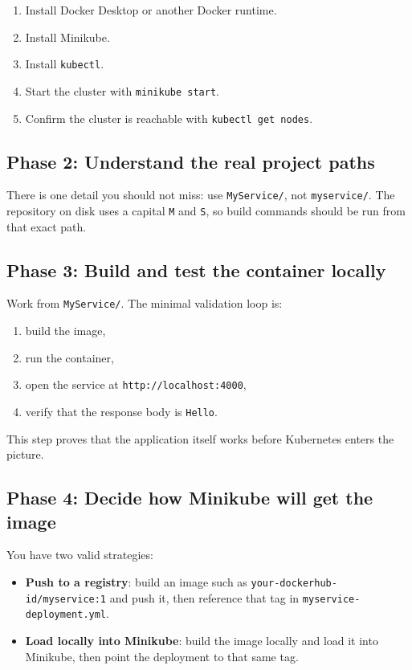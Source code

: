 \documentclass[11pt,a4paper]{article}
\newcommand{\pathitem}[1]{\texorpdfstring{\nolinkurl{#1}}{#1}}
\newcommand{\cmd}[1]{\texttt{#1}}
\begin{document}
\begin{enumerate}
\item Install Docker Desktop or another Docker runtime.
\item Install Minikube.
\item Install \cmd{kubectl}.
\item Start the cluster with \cmd{minikube start}.
\item Confirm the cluster is reachable with \cmd{kubectl get nodes}.
\end{enumerate}

\subsection{Phase 2: Understand the real project paths}

There is one detail you should not miss: use \pathitem{MyService/}, not \pathitem{myservice/}. The repository on disk uses a capital \texttt{M} and \texttt{S}, so build commands should be run from that exact path.

\subsection{Phase 3: Build and test the container locally}

Work from \pathitem{MyService/}. The minimal validation loop is:

\begin{enumerate}
\item build the image,
\item run the container,
\item open the service at \cmd{http://localhost:4000},
\item verify that the response body is \cmd{Hello}.
\end{enumerate}

This step proves that the application itself works before Kubernetes enters the picture.

\subsection{Phase 4: Decide how Minikube will get the image}

You have two valid strategies:

\begin{itemize}
\item \textbf{Push to a registry}: build an image such as \cmd{your-dockerhub-id/myservice:1} and push it, then reference that tag in \pathitem{myservice-deployment.yml}.
\item \textbf{Load locally into Minikube}: build the image locally and load it into Minikube, then point the deployment to that same tag.
\end{itemize}
\end{document}
